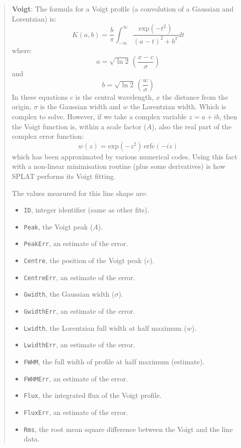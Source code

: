 \documentclass[twoside,11pt]{article}
\renewcommand{\_}{\texttt{\symbol{95}}}
\newcommand{\labelitem}[1]{\textbf{#1}}
\newcommand{\hitext}[1]{\texttt{#1}}
\begin{document}
\begin{quote}
 \labelitem{Voigt}: The formula for a Voigt profile (a convolution of a
 Gaussian and Lorentzian) is:
 \[
 K(a,b) = \frac{b}{\pi}\int_{-\infty}^{\infty}\frac{\mathrm{exp}(-t^{2})}{(a-t)^{2}+b^{2}}dt
 \]
 where:
 \[
 a = \sqrt{\ln{2}} \, \left(\frac{x-c}{\sigma}\right)
 \]
 and
 \[
 b = \sqrt{\ln{2}} \, \left(\frac{w}{\sigma}\right)
 \]
 In these equations $c$ is the central wavelength, $x$ the distance
 from the origin, $\sigma$ is the
 Gaussian width and $w$ the Lorentzian width. Which is complex to
 solve. However, if we take a complex variable $z=a+ib$, then the
 Voigt function is, within a scale factor ($A$), also the real part of
 the complex error function:
 \[
 w(z) = \mathrm{exp}(-z^{2}) \, \mathrm{erfc}(-iz)
 \]
 which has been approximated by various numerical codes. Using this
 fact with a non-linear minimisation routine (plus some derivatives) is
 how SPLAT performs its Voigt fitting.

 The values measured for this line shape are:
 \begin{itemize}
   \item \hitext{ID}, integer identifier (same as other fits).
   \item \hitext{Peak}, the Voigt peak ($A$).
   \item \hitext{PeakErr}, an estimate of the error.
   \item \hitext{Centre}, the position of the Voigt peak ($c$).
   \item \hitext{CentreErr}, an estimate of the error.
   \item \hitext{Gwidth}, the Gaussian width ($\sigma$).
   \item \hitext{GwidthErr}, an estimate of the error.
   \item \hitext{Lwidth}, the Lorentzian full width at half maximum ($w$).
   \item \hitext{LwidthErr}, an estimate of the error.
   \item \hitext{FWHM}, the full width of profile at half maximum (estimate).
   \item \hitext{FWHMErr}, an estimate of the error.
   \item \hitext{Flux}, the integrated flux of the Voigt profile.
   \item \hitext{FluxErr}, an estimate of the error.
   \item \hitext{Rms}, the root mean square difference between the
         Voigt and the line data.
 \end{itemize}
\end{quote}
\end{document}
